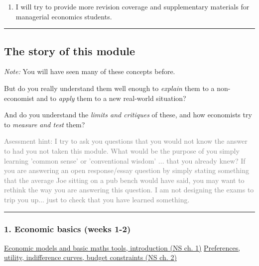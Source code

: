 \documentclass[]{article}
\providecommand{\tightlist}{%
  \setlength{\itemsep}{0pt}\setlength{\parskip}{0pt}}
\begin{document}
\begin{enumerate}
\def\labelenumi{\arabic{enumi}.}
\setcounter{enumi}{5}
\tightlist
\item
  I will try to provide more revision coverage and supplementary
  materials for managerial economics students.
\end{enumerate}

\begin{center}\rule{0.5\linewidth}{\linethickness}\end{center}

\hypertarget{the-story-of-this-module}{%
\subsection{The story of this module}\label{the-story-of-this-module}}

\emph{Note:} You will have seen many of these concepts before.

But do you really understand them well enough to \emph{explain} them to
a non-economist and to \emph{apply} them to a new real-world situation?

And do you understand the \emph{limits and critiques} of these, and how
economists try to \emph{measure and test} them?

\textcolor{gray}{Asessment hint: I try to ask you questions that you would not know the answer to had you not taken this module. What would be the purpose of you simply learning 'common sense' or 'conventional wisdom' ... that you already knew? If you are answering an open response/essay question by simply stating something that the average Joe sitting on a pub bench would have said,  you may want to rethink the way you are answering this question. I am not designing the exams to trip you up... just to check that you have learned something.}

\begin{center}\rule{0.5\linewidth}{\linethickness}\end{center}

\hypertarget{economic-basics-weeks-1-2}{%
\subsubsection{1. Economic basics (weeks
1-2)}\label{economic-basics-weeks-1-2}}

\underline{Economic models and basic maths tools, introduction (NS ch. 1)}
\underline{Preferences, utility, indifference curves, budget constraints (NS ch. 2)}
\end{document}
